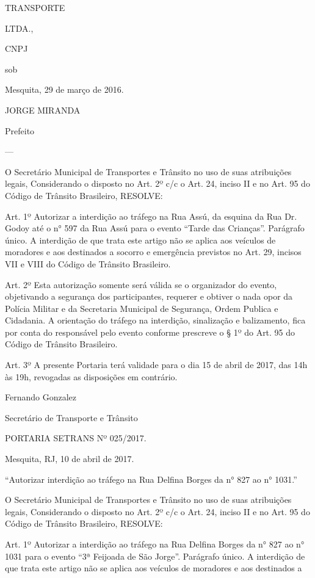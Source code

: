 \documentclass{doliberto}
\begin{document}
TRANSPORTE 

LTDA., 

CNPJ 

sob 

Mesquita, 29 de março de 2016. 

JORGE MIRANDA 

Prefeito 

---

O Secretário Municipal de Transportes e Trânsito no uso de 
suas atribuições legais,  
Considerando o disposto no Art. 2º c/c o Art. 24, inciso II e 
no Art. 95 do Código de Trânsito Brasileiro,  
RESOLVE:  
 
Art. 1º Autorizar a interdição ao tráfego na Rua Assú, da 
esquina da Rua Dr. Godoy até o n° 597 da Rua Assú para o 
evento “Tarde das Crianças”. 
Parágrafo único. A interdição de que trata este artigo não se 
aplica aos veículos de moradores e aos destinados a 
socorro e emergência previstos no Art. 29, incisos VII e VIII 
do Código de Trânsito Brasileiro.  
 
Art. 2º Esta autorização somente será válida se o 
organizador do evento, objetivando a segurança dos 
participantes, requerer e obtiver o nada opor da Polícia 
Militar e da Secretaria Municipal de Segurança, Ordem 
Publica e Cidadania.  A orientação do tráfego na 
interdição, sinalização e balizamento, fica por conta do 
responsável pelo evento conforme prescreve o § 1º do 
Art. 95 do Código de Trânsito Brasileiro.  
 
Art. 3º A presente Portaria terá validade para o dia 15 de 
abril de 2017, das 14h às 19h, revogadas as disposições em 
contrário. 
 

Fernando Gonzalez 

Secretário de Transporte e Trânsito 

 
PORTARIA SETRANS Nº 025/2017.                                  
                             
        Mesquita, 
RJ, 10 de abril de 2017. 
 
“Autorizar interdição ao tráfego na Rua Delfina Borges da 
n° 827 ao n° 1031.” 
 
 
O Secretário Municipal de Transportes e Trânsito no uso de 
suas atribuições legais,  
Considerando o disposto no Art. 2º c/c o Art. 24, inciso II e 
no Art. 95 do Código de Trânsito Brasileiro,  
RESOLVE:  
 
Art. 1º Autorizar a interdição ao tráfego na Rua Delfina 
Borges da n° 827 ao n° 1031 para o evento “3ª Feijoada de 
São Jorge”. 
Parágrafo único. A interdição de que trata este artigo não se 
aplica aos veículos de moradores e aos destinados a 
\end{document}
